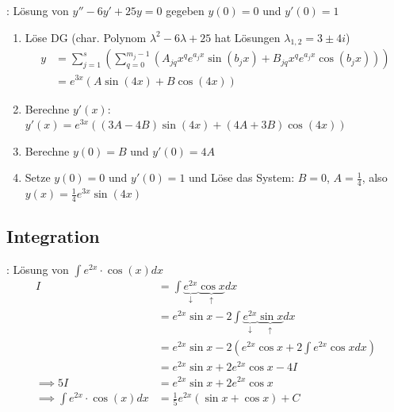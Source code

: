 \Bsp {}: Lösung von $y'' - 6y' + 25y = 0$ gegeben $y(0) = 0$ und $y'(0) = 1$
\begin{enumerate}
    \item Löse DG (char. Polynom $\lambda^2 - 6\lambda + 25$ hat Lösungen $\lambda_{1, 2} = 3 \pm 4i$)
    \begin{align*}
        y &= \sum_{j=1}^{s} \left(\sum_{q=0}^{m_j-1}(A_{jq} x^q e^{a_j x} \sin(b_j x) + B_{jq} x^q e^{a_j x} \cos(b_j x))\right) \\
          &= e^{3x} (A \sin(4 x) + B  \cos(4 x))
    \end{align*}
    \item Berechne $y'(x)$: $y'(x) = e^{3x} ((3A - 4B) \sin(4x) + (4A + 3B) \cos(4x))$
    \item Berechne $y(0) = B$ und $y'(0) = 4A$
    \item Setze $y(0) = 0$ und $y'(0) = 1$ und Löse das System: $B = 0$, $A = \frac{1}{4}$,
     also  $y(x) = \frac{1}{4}e^{3x} \sin(4 x)$
\end{enumerate}

\subsection{Integration}

\Bsp {}: Lösung von $\displaystyle \int e^{2x} \cdot \cos(x) dx$
\vspace{-0.6em}
\begin{align*}
     I &= \int \underbrace{e^{2x}}_\downarrow \underbrace{\cos x}_\uparrow dx \\[-0.8em]
       &= e^{2x} \sin x - 2 \int \underbrace{e^{2x}}_\downarrow \underbrace{\sin x}_\uparrow dx \\[-0.8em]
       &= e^{2x} \sin x - 2 (e^{2x} \cos x + 2 \int e^{2x} \cos x dx) \\[-0.6em]
       &= e^{2x} \sin x + 2 e^{2x} \cos x - 4 I \\[-0.2em]
    \implies 5I &= e^{2x} \sin x + 2 e^{2x} \cos x \\[-0.4em]
    \implies \int e^{2x} \cdot \cos(x) dx &= \frac{1}{5}e^{2x}(\sin x + \cos x) + C
\end{align*}


